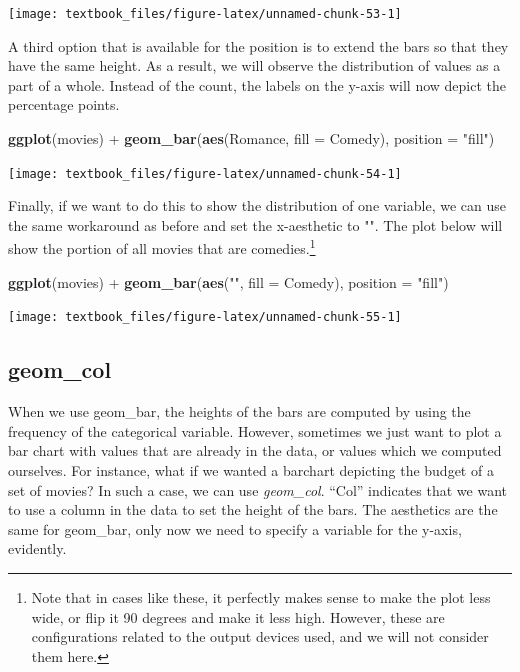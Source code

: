 \documentclass[]{tufte-book}
\newenvironment{Shaded}{}{}
\newcommand{\DataTypeTok}[1]{\textcolor[rgb]{0.56,0.13,0.00}{#1}}
\newcommand{\KeywordTok}[1]{\textcolor[rgb]{0.00,0.44,0.13}{\textbf{#1}}}
\newcommand{\NormalTok}[1]{#1}
\newcommand{\OperatorTok}[1]{\textcolor[rgb]{0.40,0.40,0.40}{#1}}
\newcommand{\StringTok}[1]{\textcolor[rgb]{0.25,0.44,0.63}{#1}}
\begin{document}
\texttt{[image: textbook\_files/figure-latex/unnamed-chunk-53-1]}

A third option that is available for the position is to extend the bars so that they have the same height. As a result, we will observe the distribution of values as a part of a whole. Instead of the count, the labels on the y-axis will now depict the percentage points.

\begin{Shaded}
\begin{Highlighting}[]
\KeywordTok{ggplot}\NormalTok{(movies) }\OperatorTok{+}
\StringTok{    }\KeywordTok{geom_bar}\NormalTok{(}\KeywordTok{aes}\NormalTok{(Romance, }\DataTypeTok{fill =}\NormalTok{ Comedy), }\DataTypeTok{position =} \StringTok{"fill"}\NormalTok{) }
\end{Highlighting}
\end{Shaded}

\texttt{[image: textbook\_files/figure-latex/unnamed-chunk-54-1]}

Finally, if we want to do this to show the distribution of one variable, we can use the same workaround as before and set the x-aesthetic to "". The plot below will show the portion of all movies that are comedies.\footnote{Note that in cases like these, it perfectly makes sense to make the plot less wide, or flip it 90 degrees and make it less high. However, these are configurations related to the output devices used, and we will not consider them here.}

\begin{Shaded}
\begin{Highlighting}[]
\KeywordTok{ggplot}\NormalTok{(movies) }\OperatorTok{+}
\StringTok{    }\KeywordTok{geom_bar}\NormalTok{(}\KeywordTok{aes}\NormalTok{(}\StringTok{""}\NormalTok{, }\DataTypeTok{fill =}\NormalTok{ Comedy), }\DataTypeTok{position =} \StringTok{"fill"}\NormalTok{) }
\end{Highlighting}
\end{Shaded}

\texttt{[image: textbook\_files/figure-latex/unnamed-chunk-55-1]}

\hypertarget{geom_col}{%
\subsection{geom\_col}\label{geom_col}}

When we use geom\_bar, the heights of the bars are computed by using the frequency of the categorical variable. However, sometimes we just want to plot a bar chart with values that are already in the data, or values which we computed ourselves. For instance, what if we wanted a barchart depicting the budget of a set of movies? In such a case, we can use \emph{geom\_col}. ``Col'' indicates that we want to use a column in the data to set the height of the bars. The aesthetics are the same for geom\_bar, only now we need to specify a variable for the y-axis, evidently.
\end{document}

